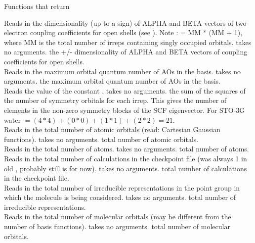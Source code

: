 \begin{center}
Functions that return 
\end{center}
{Reads in the dimensionality (up to a sign) of ALPHA and BETA vectors of 
two-electron coupling coefficients for open shells (see 
).
Note :  = MM * (MM + 1), where MM is the total number of
irreps containing singly occupied orbitals.}
{takes no arguments.}
{the +/- dimensionality of ALPHA and BETA vectors of 
coupling coefficients for open shells.} \\

\noindent {}
{Reads in the maximum orbital quantum number of AOs in the basis.}
{takes no arguments.}
{the maximum orbital quantum number of AOs in the basis.} \\

\noindent {}
{Reads the value of the constant .}
{takes no arguments.}
{the sum of the squares of the number of symmetry
orbitals for each irrep.  This gives the number of elements in the
non-zero symmetry blocks of the SCF eigenvector.  For STO-3G water
$ = (4*4) + (0*0) + (1*1) + (2*2) = 21$.} \\

\noindent {}
{Reads in the total number of atomic orbitals (read: Cartesian Gaussian 
functions).}
{takes no arguments.}
{total number of atomic orbitals.} \\

\noindent {}
{Reads in the total number of atoms.}
{takes no arguments.}
{total number of atoms.} \\

\noindent {}
{Reads in the total number of calculations in the checkpoint file
(was always 1 in old , probably still is for now).}
{takes no arguments.}
{total number of calculations in the checkpoint file.} \\

\noindent {}
{Reads in the total number of irreducible representations
in the point group in which the molecule is being considered.}
{takes no arguments.}
{total number of irreducible representations.} \\

\noindent {}
{Reads in the total number of molecular orbitals (may be different
from the number of basis functions).}
{takes no arguments.}
{total number of molecular orbitals.} \\

